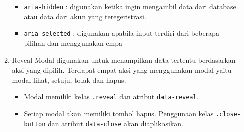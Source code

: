 \documentclass[a4paper,twoside]{article}
\begin{document}
\begin{enumerate}
\begin{enumerate}
\begin{itemize}
				\item \colorbox{mygray}{\texttt{aria-hidden}} : digunakan ketika ingin mengambil data dari database atau data dari akun yang teregeristrasi.
				\item \colorbox{mygray}{\texttt{aria-selected}} : digunakan apabila input terdiri dari beberapa pilihan dan menggunakan empa
			\end{itemize}	
			\item Reveal
			Modal digunakan untuk menampilkan data tertentu berdasarkan aksi yang dipilih. Terdapat empat aksi yang menggunakan modal yaitu modal lihat, setuju, tolak dan hapus.
			\begin{itemize}
				\item Modal memiliki kelas \colorbox{mygray}{\texttt{.reveal}} dan atribut \colorbox{mygray}{\texttt{data-reveal}}.
				\item Setiap modal akan memiliki tombol hapus. Penggunaan kelas \texttt{.close-button} dan atribut \colorbox{mygray}{\texttt{data-close}} akan diaplikasikan.
			\end{itemize} 	 
		\end{enumerate}
		

\end{enumerate}
\end{document}
